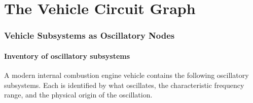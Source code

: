 \documentclass[twocolumn,10pt,a4paper]{article}
\theoremstyle{definition}
\theoremstyle{remark}
\begin{document}

\part{The Vehicle Circuit Graph}

\section{Vehicle Subsystems as Oscillatory Nodes}\label{sec:nodes}

\subsection{Inventory of oscillatory subsystems}

A modern internal combustion engine vehicle contains the following oscillatory subsystems. Each is identified by what oscillates, the characteristic frequency range, and the physical origin of the oscillation.
\end{document}
